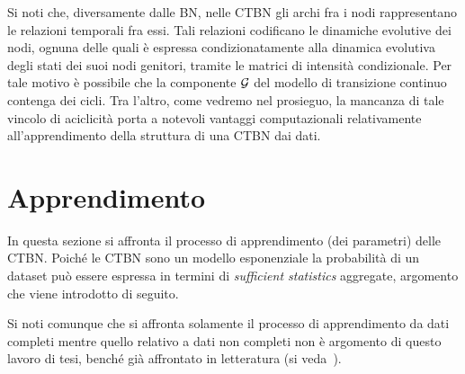 Si noti che, diversamente dalle \acl{BN}, nelle \acl{CTBN} gli archi fra i nodi rappresentano le relazioni temporali fra essi. Tali relazioni codificano le dinamiche evolutive dei nodi, ognuna delle quali è espressa condizionatamente alla dinamica evolutiva degli stati dei suoi nodi genitori, tramite le matrici di intensità condizionale. Per tale motivo è possibile che la componente $\mathcal{G}$ del modello di transizione continuo contenga dei cicli. Tra l'altro, come vedremo nel prosieguo, la mancanza di tale vincolo di aciclicità porta a notevoli vantaggi computazionali relativamente all'apprendimento della struttura di una \acs{CTBN} dai dati.




\section{Apprendimento}
\label{sec:ctbn-apprendimento}
In questa sezione si affronta il processo di apprendimento (dei parametri) delle \acl{CTBN}.
Poiché le \acs{CTBN} sono un modello esponenziale la probabilità di un dataset può essere espressa in termini di \emph{sufficient statistics} aggregate, argomento che viene introdotto di seguito.

Si noti comunque che si affronta solamente il processo di apprendimento da dati completi mentre quello relativo a dati non completi non è argomento di questo lavoro di tesi, benché già affrontato in letteratura (si veda~\cite{Nodelman2007}).


